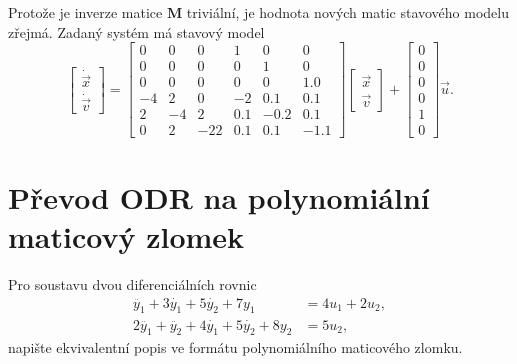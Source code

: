 \documentclass[twoside]{article}
\begin{document}
Protože je inverze matice $\mathbf{M}$ triviální,
je hodnota nových matic stavového modelu zřejmá. Zadaný systém má stavový model
\begin{equation}
	\begin{bmatrix}
		\dot{\vec{x}} \\ \dot{\vec{v}}
	\end{bmatrix} = \begin{bmatrix}
		0    &     0 &        0 &   1 &        0 &        0 \\
		0    &     0 &        0 &        0 &   1 &        0 \\
		0    &     0 &        0 &        0 &        0 &   1.0 \\
  -4    &2 &        0 &  -2 &   0.1 &   0.1 \\
   2   &-4 &   2 &   0.1 &  -0.2 &   0.1 \\
		0    &2 & -22 &   0.1 &   0.1 &  -1.1 
	\end{bmatrix} 	\begin{bmatrix}
		\vec{x} \\ \vec{v}
	\end{bmatrix} + \begin{bmatrix}
		0\\0\\0\\0\\1\\0
	\end{bmatrix} \vec{u}.
\end{equation}

\section{Převod ODR na polynomiální maticový zlomek}
Pro soustavu dvou diferenciálních rovnic
\begin{equation}
	\begin{split}
			\ddot{y_1} + 3 \dot{y_1} + 5 \dot{y_2} + 7 y_1 &= 4 u_1 + 2 u_2, \\
			2 \ddot{y_1} + \ddot{y_2} + 4 \dot{y_1} +5 \dot{y_2} +8 y_2 &= 5 u_2,
	\end{split}
\end{equation}
napište ekvivalentní popis ve formátu polynomiálního maticového zlomku.
\end{document}

